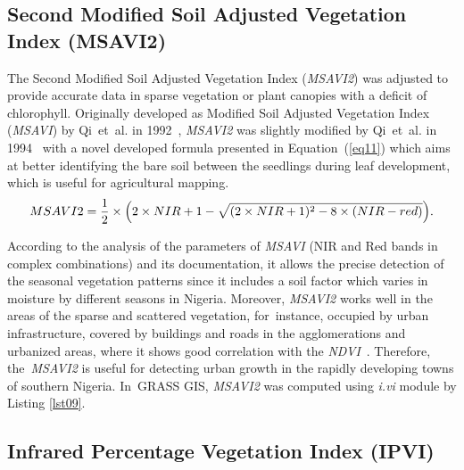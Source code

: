 \documentclass[jmse,article,accept,pdftex,moreauthors]{Definitions/mdpi}
\begin{document}

\subsection{Second Modified Soil Adjusted Vegetation Index (MSAVI2)}

The Second Modified Soil Adjusted Vegetation Index (\emph{MSAVI2}) was adjusted to provide accurate data in sparse vegetation or plant canopies with a deficit of chlorophyll. Originally developed as Modified Soil Adjusted Vegetation Index (\emph{MSAVI}) by Qi~et~al. in 1992~\cite{QI1994119}, \emph{MSAVI2} was slightly modified by Qi~et~al. in 1994~\cite{Qi1994ExternalFC} with a novel developed formula presented in Equation~(\ref{eq11}) which aims at better identifying the bare soil between the seedlings during leaf development, which is useful for agricultural mapping.
\begin{equation}\label{eq11}
	MSAVI2 = \frac{1}{2} \times \Bigl(2 \times NIR+1-\sqrt{(2 \times NIR+1)^2-8 \times (NIR-red)}\Bigr).
\end{equation} 

According to the analysis of the parameters of \emph{MSAVI} (NIR and Red bands in complex combinations) and its documentation, it allows the precise detection of the seasonal vegetation patterns since it includes a soil factor which varies in moisture by different seasons in Nigeria. Moreover, \emph{MSAVI2} works well in the areas of the sparse and scattered vegetation, for~instance, occupied by urban infrastructure, covered by buildings and roads in the agglomerations and urbanized areas, where it shows good correlation with the \emph{NDVI}~\cite{FABIJANCZYK2022100721}. Therefore, the~\emph{MSAVI2} is useful for detecting urban growth in the rapidly developing towns of southern Nigeria. In~GRASS GIS, \emph{MSAVI2} was computed using \emph{i.vi} module by Listing \ref{lst09}.

\subsection{Infrared Percentage Vegetation Index (IPVI)}
\end{document}
